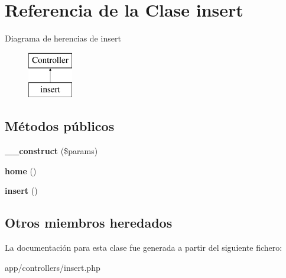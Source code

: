 \hypertarget{classinsert}{}\section{Referencia de la Clase insert}
\label{classinsert}
Diagrama de herencias de insert\begin{figure}[H]
\begin{center}
\leavevmode
\includegraphics[height=2.000000cm]{classinsert}
\end{center}
\end{figure}
\subsection*{Métodos públicos}
\begin{DoxyCompactItemize}
\item 
\hypertarget{classinsert_a9162320adff1a1a4afd7f2372f753a3e}{}{\bfseries \+\_\+\+\_\+construct} (\$params)\label{classinsert_a9162320adff1a1a4afd7f2372f753a3e}

\item 
\hypertarget{classinsert_a174b8e4c7d4d7363c6f773671defdeff}{}{\bfseries home} ()\label{classinsert_a174b8e4c7d4d7363c6f773671defdeff}

\item 
\hypertarget{classinsert_a473241246338cfccc4709ba896749019}{}{\bfseries insert} ()\label{classinsert_a473241246338cfccc4709ba896749019}

\end{DoxyCompactItemize}
\subsection*{Otros miembros heredados}


La documentación para esta clase fue generada a partir del siguiente fichero\+:\begin{DoxyCompactItemize}
\item 
app/controllers/insert.\+php\end{DoxyCompactItemize}
